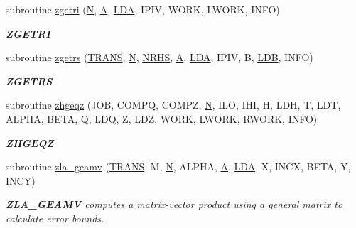\begin{DoxyCompactItemize}
subroutine \hyperlink{group__complex16GEcomputational_gab490cfc4b92edec5345479f19a9a72ca}{zgetri} (\hyperlink{polmisc_8c_a0240ac851181b84ac374872dc5434ee4}{N}, \hyperlink{classA}{A}, \hyperlink{example__user_8c_ae946da542ce0db94dced19b2ecefd1aa}{L\+D\+A}, I\+P\+I\+V, W\+O\+R\+K, L\+W\+O\+R\+K, I\+N\+F\+O)
\begin{DoxyCompactList}\small\item\em {\bfseries Z\+G\+E\+T\+R\+I} \end{DoxyCompactList}\item 
subroutine \hyperlink{group__complex16GEcomputational_ga3a5b88a7e8bf70591e521e86464e109d}{zgetrs} (\hyperlink{superlu__enum__consts_8h_a0c4e17b2d5cea33f9991ccc6a6678d62a1f61e3015bfe0f0c2c3fda4c5a0cdf58}{T\+R\+A\+N\+S}, \hyperlink{polmisc_8c_a0240ac851181b84ac374872dc5434ee4}{N}, \hyperlink{example__user_8c_aa0138da002ce2a90360df2f521eb3198}{N\+R\+H\+S}, \hyperlink{classA}{A}, \hyperlink{example__user_8c_ae946da542ce0db94dced19b2ecefd1aa}{L\+D\+A}, I\+P\+I\+V, B, \hyperlink{example__user_8c_a50e90a7104df172b5a89a06c47fcca04}{L\+D\+B}, I\+N\+F\+O)
\begin{DoxyCompactList}\small\item\em {\bfseries Z\+G\+E\+T\+R\+S} \end{DoxyCompactList}\item 
subroutine \hyperlink{group__complex16GEcomputational_ga56eeaaec72c76c53df90a3aed330f17a}{zhgeqz} (J\+O\+B, C\+O\+M\+P\+Q, C\+O\+M\+P\+Z, \hyperlink{polmisc_8c_a0240ac851181b84ac374872dc5434ee4}{N}, I\+L\+O, I\+H\+I, H, L\+D\+H, T, L\+D\+T, A\+L\+P\+H\+A, B\+E\+T\+A, Q, L\+D\+Q, Z, L\+D\+Z, W\+O\+R\+K, L\+W\+O\+R\+K, R\+W\+O\+R\+K, I\+N\+F\+O)
\begin{DoxyCompactList}\small\item\em {\bfseries Z\+H\+G\+E\+Q\+Z} \end{DoxyCompactList}\item 
subroutine \hyperlink{group__complex16GEcomputational_ga1e2dcac0e299d54a42d42a0ae39aec60}{zla\+\_\+geamv} (\hyperlink{superlu__enum__consts_8h_a0c4e17b2d5cea33f9991ccc6a6678d62a1f61e3015bfe0f0c2c3fda4c5a0cdf58}{T\+R\+A\+N\+S}, M, \hyperlink{polmisc_8c_a0240ac851181b84ac374872dc5434ee4}{N}, A\+L\+P\+H\+A, \hyperlink{classA}{A}, \hyperlink{example__user_8c_ae946da542ce0db94dced19b2ecefd1aa}{L\+D\+A}, X, I\+N\+C\+X, B\+E\+T\+A, Y, I\+N\+C\+Y)
\begin{DoxyCompactList}\small\item\em {\bfseries Z\+L\+A\+\_\+\+G\+E\+A\+M\+V} computes a matrix-\/vector product using a general matrix to calculate error bounds. \end{DoxyCompactList}\item 

\end{DoxyCompactItemize}
